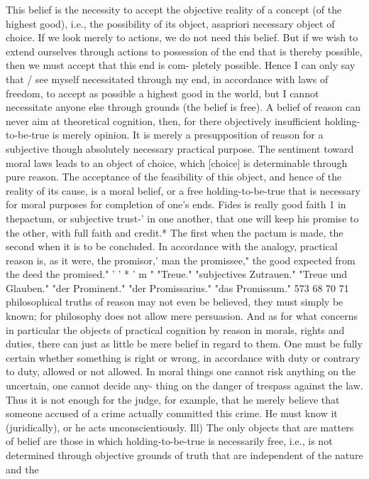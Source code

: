 This belief is the necessity to accept the objective reality of a concept (of the highest
good), i.e., the possibility of its object, asapriori necessary object of choice. If we look merely
to actions, we do not need this belief. But if we wish to extend ourselves through actions to
possession of the end that is thereby possible, then we must accept that this end is com-
pletely possible. Hence I can only say that / see myself necessitated through my end, in
accordance with laws of freedom, to accept as possible a highest good in the world, but I
cannot necessitate anyone else through grounds (the belief is free).
A belief of reason can never aim at theoretical cognition, then, for there objectively
insufficient holding-to-be-true is merely opinion. It is merely a presupposition of reason for
a subjective though absolutely necessary practical purpose. The sentiment toward moral
laws leads to an object of choice, which [choice] is determinable through pure reason. The
acceptance of the feasibility of this object, and hence of the reality of its cause, is a moral
belief, or a free holding-to-be-true that is necessary for moral purposes for completion of
one's ends.
Fides is really good faith 1 in thepactum, or subjective trust-' in one another, that one will keep
his promise to the other, with full faith and credit.* The first when the pactum is made, the
second when it is to be concluded.
In accordance with the analogy, practical reason is, as it were, the promisor,' man the
promissee," the good expected from the deed the promised."
'
'
*
'
m
"
"Treue."
"subjectives Zutrauen."
"Treue und Glauben."
"der Prominent."
"der Promissarius."
"das Promissum."
573
68
70
71
philosophical truths of reason may not even be believed, they must simply
be known; for philosophy does not allow mere persuasion. And as for
what concerns in particular the objects of practical cognition by reason in
morals, rights and duties, there can just as little be mere belief in regard to
them. One must be fully certain whether something is right or wrong, in
accordance with duty or contrary to duty, allowed or not allowed. In moral
things one cannot risk anything on the uncertain, one cannot decide any-
thing on the danger of trespass against the law. Thus it is not enough for the
judge, for example, that he merely believe that someone accused of a crime
actually committed this crime. He must know it (juridically), or he acts
unconscientiously.
Ill) The only objects that are matters of belief are those in which
holding-to-be-true is necessarily free, i.e., is not determined through
objective grounds of truth that are independent of the nature and the
